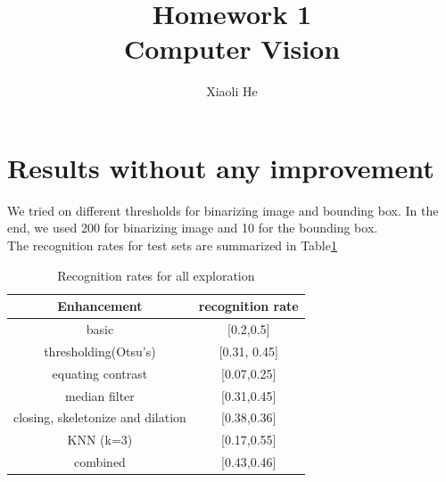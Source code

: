 \documentclass{extarticle}
\theoremstyle{definition}
\theoremstyle{definition}
\begin{document}
\title{Homework 1\\
	Computer Vision}
\author{Xiaoli He}
\maketitle
\newpage

\section{Results without any improvement}
We tried on different thresholds for binarizing image and bounding box. In the end, we used 200 for binarizing image and 10 for the bounding box.\\
The recognition rates for test sets are summarized in Table\ref{tab1}\\
\begin{table}
\centering
\caption{Recognition rates for all exploration}
\begin{tabular}{|c c|}
	\hline
	Enhancement & recognition rate\\
	\hline 
	basic & [0.2,0.5]\\	\hline
	thresholding(Otsu's) & [0.31, 0.45]\\	\hline
	equating contrast & [0.07,0.25]\\	\hline
	median filter & [0.31,0.45]\\	\hline
	closing, skeletonize and dilation & [0.38,0.36]\\	\hline
	KNN (k=3) & [0.17,0.55]\\	\hline
	combined & [0.43,0.46]\\ 
	\hline
\end{tabular}

\label{tab1}
\end{table}
\end{document}
